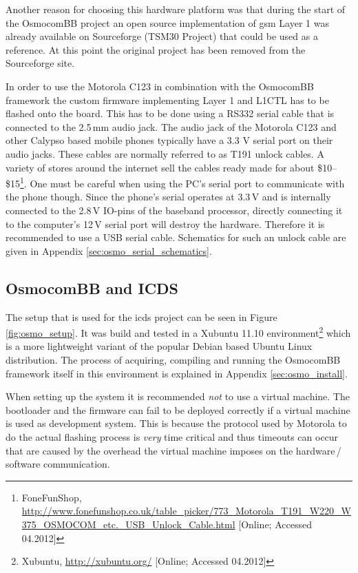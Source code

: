 Another reason for choosing this hardware platform was that during the start of the OsmocomBB project an open source implementation of \gls{gsm} Layer 1 was already available on Sourceforge (TSM30 Project) that could be used as a reference. 
At this point the original project has been removed from the Sourceforge site.

In order to use the Motorola C123 in combination with the OsmocomBB framework the custom firmware implementing Layer 1 and L1CTL has to be flashed onto the board.
This has to be done using a RS332 serial cable that is connected to the 2.5\,mm audio jack.
The audio jack of the Motorola C123 and other Calypso based mobile phones typically have a 3.3 V serial port on their audio jacks.
These cables are normally referred to as T191 unlock cables.
A variety of stores around the internet sell the cables ready made for about \$10--\$15\footnote{FoneFunShop, \url{http://www.fonefunshop.co.uk/table_picker/773_Motorola_T191_W220_W375_OSMOCOM_etc._USB_Unlock_Cable.html} [Online; Accessed 04.2012]}.
One must be careful when using the PC's serial port to communicate with the phone though.
Since the phone's serial operates at 3.3\,V and is internally connected to the 2.8\,V IO-pins of the baseband processor, directly connecting it to the computer's 12\,V serial port will destroy the hardware.
Therefore it is recommended to use a USB serial cable.
Schematics for such an unlock cable are given in Appendix \ref{sec:osmo_serial_schematics}.

\subsection{OsmocomBB and ICDS}
The setup that is used for the \gls{icds} project can be seen in Figure \ref{fig:osmo_setup}.
It was build and tested in a Xubuntu 11.10 environment\footnote{Xubuntu, \url{http://xubuntu.org/} [Online; Accessed 04.2012]} which is a more lightweight variant of the popular Debian based Ubuntu Linux distribution.
The process of acquiring, compiling and running the OsmocomBB framework itself in this environment is explained in Appendix \ref{sec:osmo_install}.

When setting up the system it is recommended \emph{not} to use a virtual machine.
The bootloader and the firmware can fail to be deployed correctly if a virtual machine is used as development system.
This is because the protocol used by Motorola to do the actual flashing process is \emph{very} time critical and thus timeouts can occur that are caused by the overhead the virtual machine imposes on the hardware\,/\,software communication.


